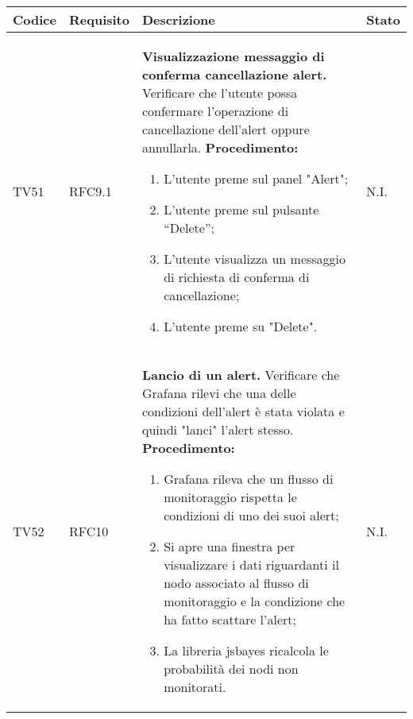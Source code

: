 \begin{table}[!htpb]
	\centering
	\renewcommand{\arraystretch}{2} 
	\begin{tabular}{|l|l|p{10cm}|l|}
		\rowcolor{orange!50}
		\hline
		\textbf{Codice} & \textbf{Requisito}& \textbf{Descrizione} & \textbf{Stato}\\ 
		\hline
		TV51 & RFC9.1 &
			\textbf{Visualizzazione messaggio di conferma cancellazione alert.} 
			\newline
			Verificare che l’utente possa confermare l'operazione di cancellazione dell'alert oppure annullarla. 
			\newline 
			\textbf{Procedimento:}
			\begin{enumerate} 
				\item L'utente preme sul panel "Alert"; 
				\item L’utente preme sul pulsante “Delete”; 
				\item L'utente visualizza un messaggio di richiesta di conferma di cancellazione;
				\item L'utente preme su "Delete".		
			\end{enumerate} 
			& N.I.\\
		\hline
		TV52 & RFC10 &
			\textbf{Lancio di un alert.} 
			\newline
			Verificare che Grafana rilevi che una delle condizioni dell'alert è stata violata e quindi "lanci" l'alert stesso. 
			\newline 
			\textbf{Procedimento:} 
			\begin{enumerate} 
				\item Grafana rileva che un flusso di monitoraggio rispetta le condizioni di uno dei suoi alert; 
				\item Si apre una finestra per visualizzare i dati riguardanti il nodo associato al flusso di monitoraggio e la condizione che ha fatto scattare l'alert; 
				\item La libreria jsbayes ricalcola le probabilità dei nodi non monitorati.		
			\end{enumerate} 
			& N.I.\\
		\hline
	\end{tabular}
\end{table}
